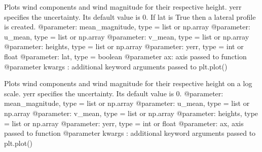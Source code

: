 \documentclass[letterpaper,10pt,english]{sphinxmanual}
\begin{document}

\begin{fulllineitems}
\label{\detokenize{index:windtunnel.plot_winddata}}
Plots wind components and wind magnitude for their respective height.
yerr specifies the uncertainty. Its default value is 0. If lat is True then
a lateral profile is created.
@parameter: mean\_magnitude, type = list or np.array
@parameter: u\_mean, type = list or np.array
@parameter: v\_mean, type = list or np.array
@parameter: heights, type = list or np.array
@parameter: yerr, type = int or float
@parameter: lat, type = boolean
@parameter ax: axis passed to function
@parameter kwargs : additional keyword arguments passed to plt.plot()

\end{fulllineitems}


\begin{fulllineitems}
\label{\detokenize{index:windtunnel.plot_winddata_log}}
Plots wind components and wind magnitude for their respective height on
a log scale. yerr specifies the uncertainty. Its default value is 0.
@parameter: mean\_magnitude, type = list or np.array
@parameter: u\_mean, type = list or np.array
@parameter: v\_mean, type = list or np.array
@parameter: heights, type = list or np.array
@parameter: yerr, type = int or float
@parameter: ax, axis passed to function
@parameter kwargs : additional keyword arguments passed to plt.plot()

\end{fulllineitems}

\end{document}
